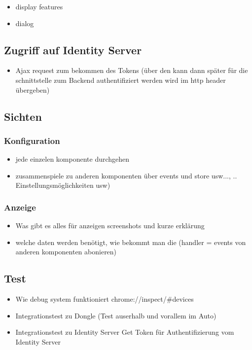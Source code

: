 \begin{itemize}
\item display features
\item dialog
\end{itemize}

\subsection{Zugriff auf Identity Server}

\begin{itemize}
\item Ajax request zum bekommen des Tokens (über den kann dann später für die schnittstelle zum Backend authentifiziert werden wird im http header übergeben)
\end{itemize}

\subsection{Sichten}

\subsubsection{Konfiguration}

\begin{itemize}
\item jede einzelen komponente durchgehen
\item zusammenspiele zu anderen komponenten über events und store usw..., .. Einstellungsmöglichkeiten usw)
\end{itemize}

\subsubsection{Anzeige}

\begin{itemize}
\item Was gibt es alles für anzeigen screenshots und kurze erklärung
\item welche daten werden benötigt, wie bekommt man die (handler = events von anderen komponenten abonieren) 
\end{itemize}

\subsection{Test}

\begin{itemize}
\item Wie debug system funktioniert chrome://inspect/\#devices
\item Integrationstest zu Dongle (Test auserhalb und vorallem im Auto)
\item Integrationstest zu Identity Server Get Token für Authentifizierung vom Identity Server
\end{itemize}

